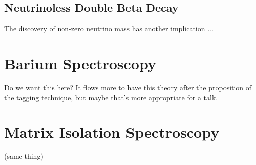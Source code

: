 \subsection{Neutrinoless Double Beta Decay}

The discovery of non-zero neutrino mass has another implication ...

\section{Barium Spectroscopy}

Do we want this here?  It flows more to have this theory after the proposition of the tagging technique, but maybe that's more appropriate for a talk.

\section{Matrix Isolation Spectroscopy}

(same thing)